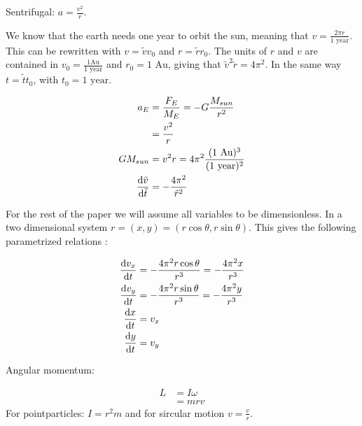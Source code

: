 
Sentrifugal: $ a = \frac{v^2}{r} $. 

We know that the earth needs one year to orbit the sun, meaning that $ v = \frac{2\pi r}{\text{1 year}} $. This can be rewritten with $ v = \tilde{v}v_0 $ and $ r = \tilde{r}r_0 $. The units of $ r $ and $ v $ are contained in  $ v_0 = \frac{1 \text{Au}}{1 \text{ year}} $ and $ r_0=1\text{ Au} $, giving that $ \tilde{v}^2\tilde{r} = 4\pi^2 $. In the same way $ t = \tilde{t}t_0 $, with $ t_0 = 1 \text{ year} $. 


\begin{align}
	a_E &= \frac{F_E}{M_E}= - G\frac{M_{sun}}{r^2}\\
	&= \frac{v^2}{r}\\
	GM_{sun}&= v^2 r = 4\pi^2 \frac{(\text{1 Au})^3}{(\text{1 year})^2}\\
	\dv{\tilde{v}}{\tilde{t}} &=- \frac{4\pi^2}{\tilde{r}^2} \label{eq:}
\end{align}

For the rest of the paper we will assume all variables to be dimensionless. 
In a two dimensional system $ r = (x,y) = (r\cos\theta, r\sin\theta) $. This gives the following parametrized relations :

\begin{align}
	\dv{{v}_x}{{t}} &=- \frac{4\pi^2r\cos\theta}{{r}^3}  =- \frac{4\pi^2x}{{r}^3} \\
		\dv{{v}_y}{{t}} &=- \frac{4\pi^2r\sin\theta}{{r}^3}  = -\frac{4\pi^2y}{{r}^3}\\
		\dv{x}{t} &= v_x\\
				\dv{y}{t} &= v_y\\
\end{align}



Angular momentum: 

\begin{align}
	L &= I\omega\\
	&= mrv
\end{align}
For pointparticles: $ 	I = r^2m $ and for sircular motion $ v = \frac{v}{r} $.